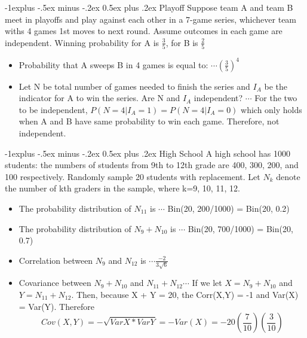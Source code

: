 \documentclass[10pt,landscape]{article}
\makeatletter
\renewcommand{\subsection}{\@startsection{subsection}{2}{0mm}%
                                {-1explus -.5ex minus -.2ex}%
                                {0.5ex plus .2ex}%
                                {\normalfont\normalsize\bfseries}}
\makeatother
\begin{document}
\begin{multicols}{3}
\subsection{Playoff}
Suppose team A and team B meet in playoffs and play against each other in a 7-game series, whichever team withs 4 games 1st moves to next round. Assume outcomes in each game are independent. Winning probability for A is $\frac{3}{5}$, for B is $\frac{2}{5}$
\begin{itemize}[noitemsep]
  \item Probability that A sweeps B in 4 games is equal to: $\cdots (\frac{3}{5})^{4}$
  \item Let N be total number of games needed to finish the series and $ I_{A} $ be the indicator for A to win the series. Are N and $I_{A} $ independent? $ \cdots $ For the two to be independent, $P(N = 4 | I_{A} = 1) = P(N = 4 | I_{A} = 0)$ which only holds when A and B have same probability to win each game. Therefore, not independent.
\end{itemize}

\subsection{High School}
A high school has 1000 students: the numbers of students from 9th to 12th grade are 400, 300, 200, and 100 respectively. Randomly sample 20 students with replacement. Let $N_{k}$ denote the number of kth graders in the sample, where k=9, 10, 11, 12. 
\begin{itemize}[noitemsep]
  \item The probability distribution of $N_{11}$ is $ \cdots $ Bin(20, 200/1000) = Bin(20, 0.2)
  \item The probability distribution of $N_{9} + N_{10}$ is $\cdots$ Bin(20, 700/1000) = Bin(20, 0.7)
  \item Correlation between $N_{9}$ and $N_{12}$ is $\cdots \frac{-2}{3\sqrt{6}}$
  \item Covariance between $N_{9} + N_{10}$ and $N_{11} + N_{12} \cdots $ If we let $X =N_{9} + N_{10}$ and $Y = N_{11} + N_{12}$. Then, because X + Y = 20, the Corr(X,Y) = -1 and Var(X) = Var(Y). Therefore
  $$Cov(X,Y) = -\sqrt{VarX * VarY} = -Var(X) = -20 (\frac{7}{10}) (\frac{3}{10})$$
\end{itemize}


\end{multicols}
\end{document}

